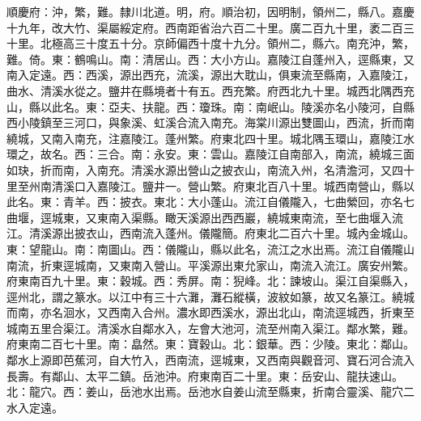 \begin{pinyinscope}
順慶府：沖，繁，難。隸川北道。明，府。順治初，因明制，領州二，縣八。嘉慶十九年，改大竹、渠屬綏定府。西南距省治六百二十里。廣二百九十里，袤二百三十里。北極高三十度五十分。京師偏西十度十九分。領州二，縣六。南充沖，繁，難。倚。東：鶴鳴山。南：清居山。西：大小方山。嘉陵江自蓬州入，逕縣東，又南入定遠。西：西溪，源出西充，流溪，源出大耽山，俱東流至縣南，入嘉陵江，曲水、清溪水從之。鹽井在縣境者十有五。西充繁。府西北九十里。城西北隅西充山，縣以此名。東：亞夫、扶龍。西：瓊珠。南：南岷山。陵溪亦名小陵河，自縣西小陵鎮至三河口，與象溪、虹溪合流入南充。海棠川源出雙圖山，西流，折而南繞城，又南入南充，注嘉陵江。蓬州繁。府東北四十里。城北隅玉環山，嘉陵江水環之，故名。西：三合。南：永安。東：雲山。嘉陵江自南部入，南流，繞城三面如玦，折而南，入南充。清溪水源出營山之披衣山，南流入州，名清澹河，又四十里至州南清溪口入嘉陵江。鹽井一。營山繁。府東北百八十里。城西南營山，縣以此名。東：青羊。西：披衣。東北：大小蓬山。流江自儀隴入，七曲縈回，亦名七曲堰，逕城東，又東南入渠縣。瞰天溪源出西西巖，繞城東南流，至七曲堰入流江。清溪源出披衣山，西南流入蓬州。儀隴簡。府東北二百六十里。城內金城山。東：望龍山。南：南圖山。西：儀隴山，縣以此名，流江之水出焉。流江自儀隴山南流，折東逕城南，又東南入營山。平溪源出東允家山，南流入流江。廣安州繁。府東南百九十里。東：穀城。西：秀屏。南：猊峰。北：諫坡山。渠江自渠縣入，逕州北，謂之篆水。以江中有三十六灘，灘石縱橫，波紋如篆，故又名篆江。繞城而南，亦名洄水，又西南入合州。濃水即西溪水，源出北山，南流逕城西，折東至城南五里合渠江。清溪水自鄰水入，左會大池河，流至州南入渠江。鄰水繁，難。府東南二百七十里。南：皛然。東：寶穀山。北：銀華。西：少陵。東北：鄰山。鄰水上源即芭蕉河，自大竹入，西南流，逕城東，又西南與觀音河、寶石河合流入長壽。有鄰山、太平二鎮。岳池沖。府東南百二十里。東：岳安山、龍扶速山。北：龍穴。西：姜山，岳池水出焉。岳池水自姜山流至縣東，折南合靈溪、龍穴二水入定遠。


\end{pinyinscope}
